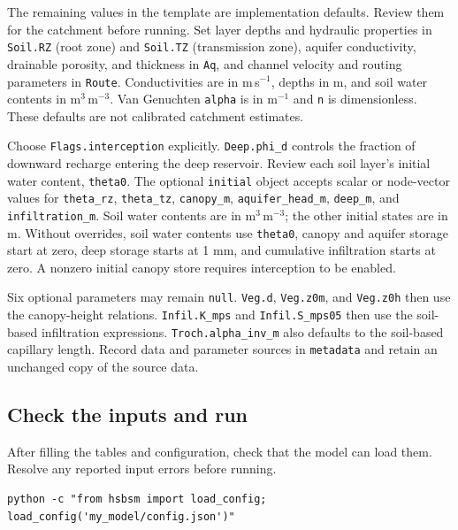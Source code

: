 The remaining values in the template are implementation defaults. Review them for the catchment before running. Set layer depths and hydraulic properties in \texttt{Soil.RZ} (root zone) and \texttt{Soil.TZ} (transmission zone), aquifer conductivity, drainable porosity, and thickness in \texttt{Aq}, and channel velocity and routing parameters in \texttt{Route}. Conductivities are in m\,s$^{-1}$, depths in m, and soil water contents in m$^3$\,m$^{-3}$. Van Genuchten \texttt{alpha} is in m$^{-1}$ and \texttt{n} is dimensionless. These defaults are not calibrated catchment estimates.

Choose \texttt{Flags.interception} explicitly. \texttt{Deep.phi\_d} controls the fraction of downward recharge entering the deep reservoir. Review each soil layer's initial water content, \texttt{theta0}. The optional \texttt{initial} object accepts scalar or node-vector values for \texttt{theta\_rz}, \texttt{theta\_tz}, \texttt{canopy\_m}, \texttt{aquifer\_head\_m}, \texttt{deep\_m}, and \texttt{infiltration\_m}. Soil water contents are in m$^3$\,m$^{-3}$; the other initial states are in m. Without overrides, soil water contents use \texttt{theta0}, canopy and aquifer storage start at zero, deep storage starts at 1 mm, and cumulative infiltration starts at zero. A nonzero initial canopy store requires interception to be enabled.

Six optional parameters may remain \texttt{null}. \texttt{Veg.d}, \texttt{Veg.z0m}, and \texttt{Veg.z0h} then use the canopy-height relations. \texttt{Infil.K\_mps} and \texttt{Infil.S\_mps05} then use the soil-based infiltration expressions. \texttt{Troch.alpha\_inv\_m} also defaults to the soil-based capillary length. Record data and parameter sources in \texttt{metadata} and retain an unchanged copy of the source data.

\subsection{Check the inputs and run}

After filling the tables and configuration, check that the model can load them. Resolve any reported input errors before running.

\begin{lstlisting}[language={},basicstyle=\ttfamily\footnotesize,caption={Load and check the configured inputs.}]
python -c "from hsbsm import load_config; load_config('my_model/config.json')"
\end{lstlisting}

